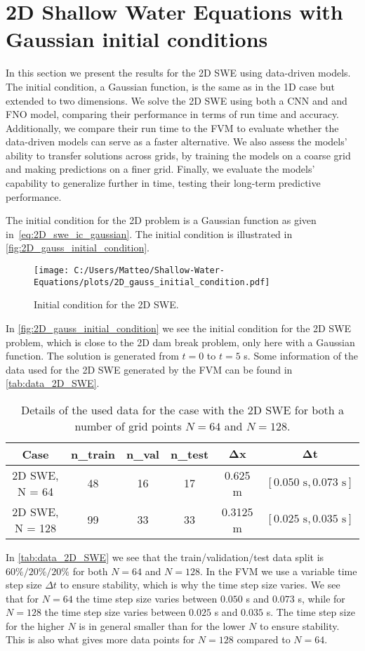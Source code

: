 \section{2D Shallow Water Equations with Gaussian initial conditions}\label{sec:data-driven-results-2D}
In this section we present the results for the 2D SWE using data-driven models. 
The initial condition, a Gaussian function, is the same as in the 1D case but extended to two dimensions.
We solve the 2D SWE using both a CNN and and FNO model, comparing their performance in terms of run time and accuracy.
Additionally, we compare their run time to the FVM to evaluate whether the data-driven models can serve as a faster alternative.
We also assess the models' ability to transfer solutions across grids, by training the models on a coarse grid and making predictions on a finer grid.
Finally, we evaluate the models' capability to generalize further in time, testing their long-term predictive performance.

The initial condition for the 2D problem is a Gaussian function as given in~\eqref{eq:2D_swe_ic_gaussian}.
The initial condition is illustrated in \autoref{fig:2D_gauss_initial_condition}.
\begin{figure}[H]
    \centering
    \texttt{[image: C:/Users/Matteo/Shallow-Water-Equations/plots/2D\_gauss\_initial\_condition.pdf]}
    \caption{Initial condition for the 2D SWE.}\label{fig:2D_gauss_initial_condition}
\end{figure}
In \autoref{fig:2D_gauss_initial_condition} we see the initial condition for the 2D SWE problem, which is close to the 2D dam break problem, only here with a Gaussian function.
The solution is generated from $t = 0$ to $t = 5$ s.
Some information of the data used for the 2D SWE generated by the FVM can be found in \autoref{tab:data_2D_SWE}.
\begin{table}[H]
    \centering
    \begin{tabular}{c|ccccc}
        \textbf{Case} & \textbf{n\_train} & \textbf{n\_val} & \textbf{n\_test} & $\mathbf{\Delta x}$ & $\mathbf{\Delta t}$ \\
        \hline
        2D SWE, N = 64 & 48 & 16 & 17 & 0.625 m  & $[0.050 \text{ s}, 0.073 \text{ s}]$ \\
        2D SWE, N = 128 & 99 & 33 & 33 & 0.3125 m  & $[0.025 \text{ s}, 0.035 \text{ s}]$ \\
    \end{tabular}
    \caption{Details of the used data for the case with the 2D SWE for both a number of grid points $N=64$ and $N=128$.}\label{tab:data_2D_SWE}
\end{table}
In \autoref{tab:data_2D_SWE} we see that the train/validation/test data split is $60\%/20\%/20\%$ for both $N = 64$ and $N = 128$.
In the FVM we use a variable time step size $\Delta t$ to ensure stability, which is why the time step size varies.
We see that for $N = 64$ the time step size varies between $0.050$ s and $0.073$ s, while for $N = 128$ the time step size varies between $0.025$ s and $0.035$ s.
The time step size for the higher $N$ is in general smaller than for the lower $N$ to ensure stability.
This is also what gives more data points for $N = 128$ compared to $N = 64$.



